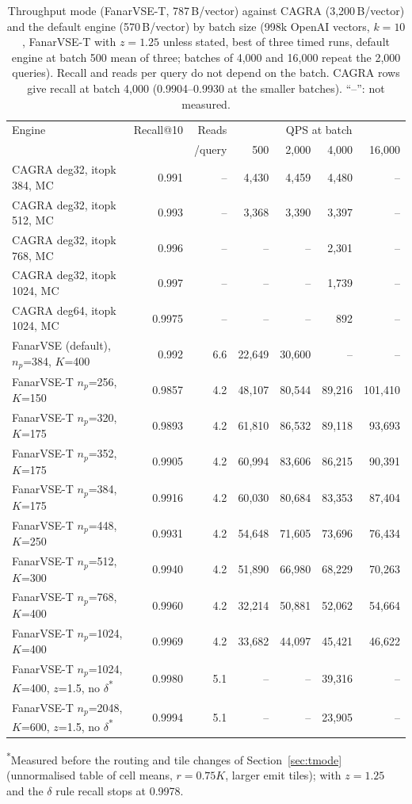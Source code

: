 \documentclass[fleqn,10pt]{wlscirep}
\begin{document}
\begin{table}[!htbp]
\caption{Throughput mode (FanarVSE-T, 787\,B/vector) against CAGRA (3{,}200\,B/vector) and the default engine (570\,B/vector) by batch size (998k OpenAI vectors, $k=10$, FanarVSE-T with $z=1.25$ unless stated, best of three timed runs, default engine at batch 500 mean of three; batches of 4{,}000 and 16{,}000 repeat the 2{,}000 queries). Recall and reads per query do not depend on the batch. CAGRA rows give recall at batch 4{,}000 (0.9904--0.9930 at the smaller batches). ``--'': not measured.}
\label{tab:tput}
\small
\setlength{\tabcolsep}{4pt}
\begin{tabular}{lrrrrrr}
\toprule
Engine & Recall@10 & Reads & \multicolumn{4}{c}{QPS at batch} \\
 & & /query & 500 & 2{,}000 & 4{,}000 & 16{,}000 \\
\midrule
CAGRA deg32, itopk 384, MC & 0.991 & -- & 4{,}430 & 4{,}459 & 4{,}480 & -- \\
CAGRA deg32, itopk 512, MC & 0.993 & -- & 3{,}368 & 3{,}390 & 3{,}397 & -- \\
CAGRA deg32, itopk 768, MC & 0.996 & -- & -- & -- & 2{,}301 & -- \\
CAGRA deg32, itopk 1024, MC & 0.997 & -- & -- & -- & 1{,}739 & -- \\
CAGRA deg64, itopk 1024, MC & 0.9975 & -- & -- & -- & 892 & -- \\
FanarVSE (default), $n_p$=384, $K$=400 & 0.992 & 6.6 & 22{,}649 & 30{,}600 & -- & -- \\
\midrule
FanarVSE-T $n_p$=256, $K$=150 & 0.9857 & 4.2 & 48{,}107 & 80{,}544 & 89{,}216 & 101{,}410 \\
FanarVSE-T $n_p$=320, $K$=175 & 0.9893 & 4.2 & 61{,}810 & 86{,}532 & 89{,}118 & 93{,}693 \\
FanarVSE-T $n_p$=352, $K$=175 & 0.9905 & 4.2 & 60{,}994 & 83{,}606 & 86{,}215 & 90{,}391 \\
FanarVSE-T $n_p$=384, $K$=175 & 0.9916 & 4.2 & 60{,}030 & 80{,}684 & 83{,}353 & 87{,}404 \\
FanarVSE-T $n_p$=448, $K$=250 & 0.9931 & 4.2 & 54{,}648 & 71{,}605 & 73{,}696 & 76{,}434 \\
FanarVSE-T $n_p$=512, $K$=300 & 0.9940 & 4.2 & 51{,}890 & 66{,}980 & 68{,}229 & 70{,}263 \\
FanarVSE-T $n_p$=768, $K$=400 & 0.9960 & 4.2 & 32{,}214 & 50{,}881 & 52{,}062 & 54{,}664 \\
FanarVSE-T $n_p$=1024, $K$=400 & 0.9969 & 4.2 & 33{,}682 & 44{,}097 & 45{,}421 & 46{,}622 \\
FanarVSE-T $n_p$=1024, $K$=400, $z$=1.5, no $\delta$\textsuperscript{*} & 0.9980 & 5.1 & -- & -- & 39{,}316 & -- \\
FanarVSE-T $n_p$=2048, $K$=600, $z$=1.5, no $\delta$\textsuperscript{*} & 0.9994 & 5.1 & -- & -- & 23{,}905 & -- \\
\bottomrule
\end{tabular}

{\footnotesize \textsuperscript{*}Measured before the routing and tile changes of Section~\ref{sec:tmode} (unnormalised table of cell means, $r=0.75K$, larger emit tiles); with $z=1.25$ and the $\delta$ rule recall stops at 0.9978.}
\end{table}
\end{document}
